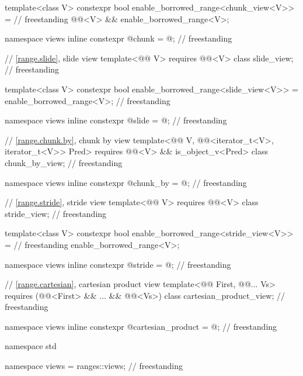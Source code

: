 \begin{codeblock}
{  template<class V>
    constexpr bool enable_borrowed_range<chunk_view<V>> =                           // freestanding
      @@<V> && enable_borrowed_range<V>;

  namespace views { inline constexpr @\unspecnc@ chunk = @\unspecnc@; }             // freestanding

  // \ref{range.slide}, slide view
  template<@@ V>
    requires @@<V>
  class slide_view;                                                                 // freestanding

  template<class V>
    constexpr bool enable_borrowed_range<slide_view<V>> =
      enable_borrowed_range<V>;                                                     // freestanding

  namespace views { inline constexpr @\unspecnc@ slide = @\unspecnc@; }             // freestanding

  // \ref{range.chunk.by}, chunk by view
  template<@@ V, @@<iterator_t<V>, iterator_t<V>> Pred>
    requires @@<V> && is_object_v<Pred>
  class chunk_by_view;                                                              // freestanding

  namespace views { inline constexpr @\unspecnc@ chunk_by = @\unspecnc@; }          // freestanding

  // \ref{range.stride}, stride view
  template<@@ V>
    requires @@<V>
  class stride_view;                                                                // freestanding

  template<class V>
    constexpr bool enable_borrowed_range<stride_view<V>> =                          // freestanding
      enable_borrowed_range<V>;

  namespace views { inline constexpr @\unspecnc@ stride = @\unspecnc@; }            // freestanding

  // \ref{range.cartesian}, cartesian product view
  template<@@ First, @@... Vs>
    requires (@@<First> && ... && @@<Vs>)
  class cartesian_product_view;                                                     // freestanding

  namespace views { inline constexpr @\unspecnc@ cartesian_product = @\unspecnc@; } // freestanding
}

namespace std {
  namespace views = ranges::views;                                                  // freestanding

}
\end{codeblock}

